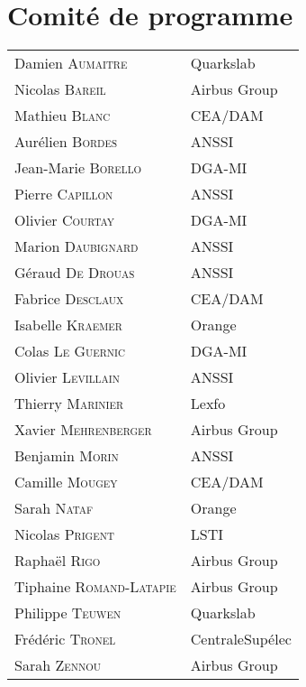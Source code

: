 \section*{Comité de programme}
\begin{tabular}{@{}p{5cm}@{}p{6.5cm}@{}}
  Damien \textsc{Aumaitre}        & Quarkslab           \\
  Nicolas  \textsc{Bareil}        & Airbus Group        \\
  Mathieu \textsc{Blanc}          & CEA/DAM             \\
  Aurélien \textsc{Bordes}        & ANSSI               \\
  Jean-Marie \textsc{Borello}     & DGA-MI              \\
  Pierre   \textsc{Capillon}      & ANSSI               \\
  Olivier \textsc{Courtay}        & DGA-MI              \\
  Marion \textsc{Daubignard}      & ANSSI               \\
  Géraud \textsc{De Drouas}       & ANSSI               \\
  Fabrice \textsc{Desclaux}       & CEA/DAM             \\
  Isabelle \textsc{Kraemer}       & Orange              \\
  Colas \textsc{Le Guernic}       & DGA-MI              \\
  Olivier \textsc{Levillain}      & ANSSI               \\
  Thierry \textsc{Marinier}       & Lexfo               \\
  Xavier \textsc{Mehrenberger}    & Airbus Group        \\
  Benjamin \textsc{Morin}         & ANSSI               \\
  Camille \textsc{Mougey}         & CEA/DAM             \\
  Sarah \textsc{Nataf}            & Orange              \\
  Nicolas \textsc{Prigent}        & LSTI                \\
  Raphaël \textsc{Rigo}           & Airbus Group        \\
  Tiphaine \textsc{Romand-Latapie} & Airbus Group       \\
  Philippe \textsc{Teuwen}        & Quarkslab           \\
  Frédéric \textsc{Tronel}        & CentraleSupélec     \\
  Sarah \textsc{Zennou}           & Airbus Group        \\
\end{tabular}



